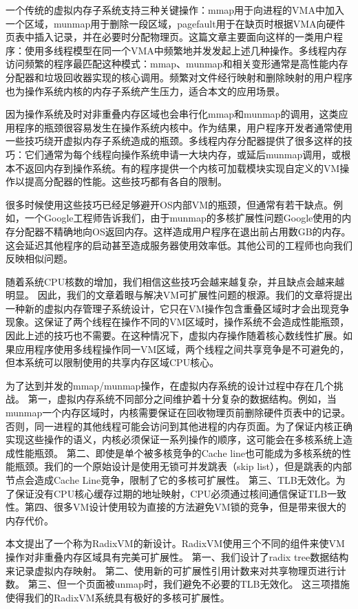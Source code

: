 一个传统的虚拟内存子系统支持三种关键操作：mmap用于向进程的VMA中加入一个区域，munmap用于删除一段区域，pagefault用于在缺页时根据VMA向硬件页表中插入记录，并在必要时分配物理页。这篇文章主要面向这样的一类用户程序：使用多线程模型在同一个VMA中频繁地并发发起上述几种操作。多线程内存访问频繁的程序最匹配这种模式：mmap、munmap和相关变形通常是高性能内存分配器和垃圾回收器实现的核心调用。频繁对文件经行映射和删除映射的用户程序也为操作系统内核的内存子系统产生压力，适合本文的应用场景。

因为操作系统及时对非重叠内存区域也会串行化mmap和munmap的调用，这类应用程序的瓶颈很容易发生在操作系统内核中。作为结果，用户程序开发者通常使用一些技巧绕开虚拟内存子系统造成的瓶颈。多线程内存分配器提供了很多这样的技巧：它们通常为每个线程向操作系统申请一大块内存，或延后munmap调用，或根本不返回内存到操作系统。有的程序提供一个内核可加载模块实现自定义的VM操作以提高分配器的性能。这些技巧都有各自的限制。

很多时候使用这些技巧已经足够避开OS内部VM的瓶颈，但通常有若干缺点。例如，一个Google工程师告诉我们，由于munmap的多核扩展性问题Google使用的内存分配器不精确地向OS返回内存。这样造成用户程序在退出前占用数GB的内存。这会延迟其他程序的启动甚至造成服务器使用效率低。其他公司的工程师也向我们反映相似问题。

随着系统CPU核数的增加，我们相信这些技巧会越来越复杂，并且缺点会越来越明显。
因此，我们的文章着眼与解决VM可扩展性问题的根源。我们的文章将提出一种新的虚拟内存管理子系统设计，它只在VM操作包含重叠区域时才会出现竞争现象。这保证了两个线程在操作不同的VM区域时，操作系统不会造成性能瓶颈，因此上述的技巧也不需要。在这种情况下，虚拟内存操作随着核心数线性扩展。如果应用程序使用多线程操作同一VM区域，两个线程之间共享竞争是不可避免的，但本系统可以限制使用的共享内存区域CPU核心。

为了达到并发的mmap/munmap操作，在虚拟内存系统的设计过程中存在几个挑战。
第一，虚拟内存系统不同部分之间维护着十分复杂的数据结构。例如，当munmap一个内存区域时，内核需要保证在回收物理页前删除硬件页表中的记录。否则，同一进程的其他线程可能会访问到其他进程的内存页面。为了保证内核正确实现这些操作的语义，内核必须保证一系列操作的顺序，这可能会在多核系统上造成性能瓶颈。
第二、即使是单个被多核竞争的Cache
line也可能成为多核系统的性能瓶颈。我们的一个原始设计是使用无锁可并发跳表（skip
list），但是跳表的内部节点会造成Cache Line竞争，限制了它的多核可扩展性。
第三、TLB无效化。为了保证没有CPU核心缓存过期的地址映射，CPU必须通过核间通信保证TLB一致性。第四、很多VM设计使用较为直接的方法避免VM锁的竞争，但是带来很大的内存代价。

本文提出了一个称为RadixVM的新设计。RadixVM使用三个不同的组件来使VM操作对非重叠内存区域具有完美可扩展性。
第一、我们设计了radix tree数据结构来记录虚拟内存映射。
第二、使用新的可扩展性引用计数来对共享物理页进行计数。
第三、但一个页面被unmap时，我们避免不必要的TLB无效化。
这三项措施使得我们的RadixVM系统具有极好的多核可扩展性。

